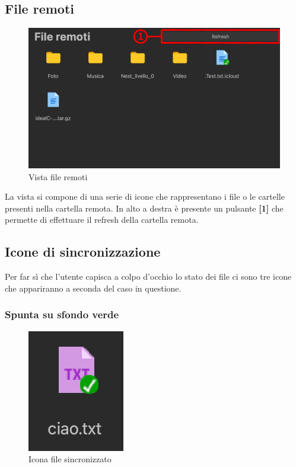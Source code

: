 \subsection{File remoti}
\label{sec:fileRemoti}
\begin{figure}[H]
    \centering
    \includegraphics[scale = 0.8]{components/img/fileRem.png}
    \caption{Vista file remoti}
    \label{fig:fileRem}
\end{figure}
La vista si compone di una serie di icone che rappresentano i file o le cartelle presenti nella cartella remota. In alto a destra è presente un pulsante \textbf{[1]} che permette di effettuare il refresh della cartella remota.

\subsection{Icone di sincronizzazione}
\label{sec:iconeSync}
Per far sì che l'utente capisca a colpo d'occhio lo stato dei file ci sono tre icone che appariranno a seconda del caso in questione.
\subsubsection{Spunta su sfondo verde}

\begin{figure}[H]
    \centering
    \includegraphics[scale = 0.8]{components/img/iconIsSync.png}
    \caption{Icona file sincronizzato}
    \label{fig:greenI}
\end{figure}

